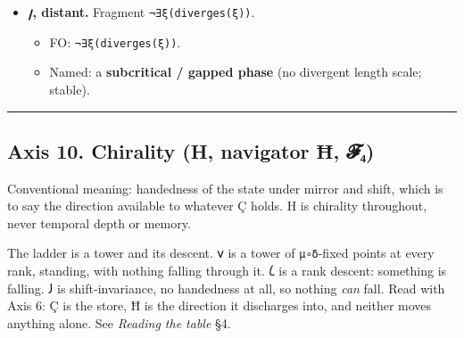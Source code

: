 \begin{itemize}
  \begin{itemize}
  \tightlist
  \item
    FO: \texttt{ξ\ →\ ∞\ ∧\ chaotic(x)}.
  \item
    Named: \textbf{divergence into chaos} (unbounded correlation without
    a fixed point; supercritical runaway).
  \end{itemize}
\item
  \textbf{𐑢, distant.} Fragment \texttt{¬∃ξ(diverges(ξ))}.

  \begin{itemize}
  \tightlist
  \item
    FO: \texttt{¬∃ξ(diverges(ξ))}.
  \item
    Named: a \textbf{subcritical / gapped phase} (no divergent length
    scale; stable).
  \end{itemize}
\end{itemize}

\begin{center}\rule{0.5\linewidth}{0.5pt}\end{center}

\hypertarget{axis-10.-chirality-h-navigator-ux127-ux1d4d5ux2084}{%
\subsection{Axis 10. Chirality (H, navigator Ħ,
𝓕₄)}\label{axis-10.-chirality-h-navigator-ux127-ux1d4d5ux2084}}

Conventional meaning: handedness of the state under mirror and shift,
which is to say the direction available to whatever Ç holds. H is
chirality throughout, never temporal depth or memory.

The ladder is a tower and its descent. 𐑫 is a tower of
\texttt{μ∘δ}-fixed points at every rank, standing, with nothing falling
through it. 𐑖 is a rank descent: something is falling. 𐑓 is
shift-invariance, no handedness at all, so nothing \emph{can} fall. Read
with Axis 6: Ç is the store, Ħ is the direction it discharges into, and
neither moves anything alone. See \emph{Reading the table} §4.

